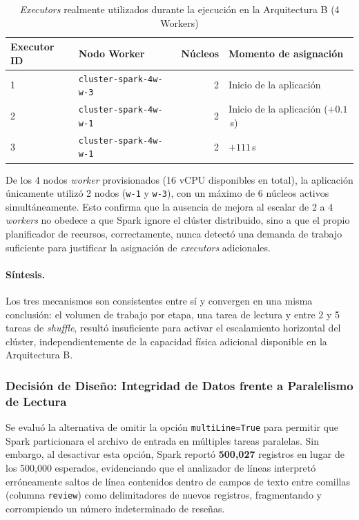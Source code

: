 \begin{table}[H]
\centering
\caption{\textit{Executors} realmente utilizados durante la ejecución en la Arquitectura B (4 Workers)}
\label{tab:executors}
\vspace{0.2cm}
\small
\begin{tabular}{llrl}
\toprule
\textbf{Executor ID} & \textbf{Nodo Worker} & \textbf{Núcleos} & \textbf{Momento de asignación} \\
\midrule
1 & \texttt{cluster-\bk{}spark-\bk{}4w-\bk{}w-\bk{}3} & 2 & Inicio de la aplicación \\
2 & \texttt{cluster-\bk{}spark-\bk{}4w-\bk{}w-\bk{}1} & 2 & Inicio de la aplicación ($+0.1$\,s) \\
3 & \texttt{cluster-\bk{}spark-\bk{}4w-\bk{}w-\bk{}1} & 2 & $+111$\,s \\
\bottomrule
\end{tabular}
\end{table}

De los 4 nodos \textit{worker} provisionados (16 vCPU disponibles en total), la aplicación únicamente utilizó 2 nodos (\texttt{w-1} y \texttt{w-3}), con un máximo de 6 núcleos activos simultáneamente. Esto confirma que la ausencia de mejora al escalar de 2 a 4 \textit{workers} no obedece a que Spark ignore el clúster distribuido, sino a que el propio planificador de recursos, correctamente, nunca detectó una demanda de trabajo suficiente para justificar la asignación de \textit{executors} adicionales.

\paragraph{Síntesis.} Los tres mecanismos son consistentes entre sí y convergen en una misma conclusión: el volumen de trabajo por etapa, una tarea de lectura y entre 2 y 5 tareas de \textit{shuffle}, resultó insuficiente para activar el escalamiento horizontal del clúster, independientemente de la capacidad física adicional disponible en la Arquitectura B.

\subsubsection{Decisión de Diseño: Integridad de Datos frente a Paralelismo de Lectura}
\label{subsec:multiline}

Se evaluó la alternativa de omitir la opción \texttt{multiLine=True} para permitir que Spark particionara el archivo de entrada en múltiples tareas paralelas. Sin embargo, al desactivar esta opción, Spark reportó \textbf{500,027} registros en lugar de los 500,000 esperados, evidenciando que el analizador de líneas interpretó erróneamente saltos de línea contenidos dentro de campos de texto entre comillas (columna \texttt{review}) como delimitadores de nuevos registros, fragmentando y corrompiendo un número indeterminado de reseñas.

